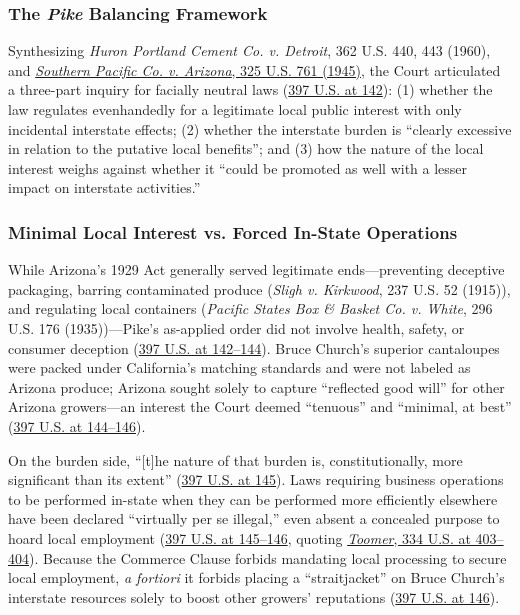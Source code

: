 \documentclass[12pt]{article}
\begin{document}
\subsubsection{The \textit{Pike} Balancing Framework}

Synthesizing \textit{Huron Portland Cement Co. v. Detroit}, 362 U.S. 440, 443 (1960), and \href{https://supreme.justia.com/cases/federal/us/325/761/}{\textit{Southern Pacific Co. v. Arizona}, 325 U.S. 761 (1945)}, the Court articulated a three-part inquiry for facially neutral laws (\href{https://supreme.justia.com/cases/federal/us/397/137/}{397 U.S. at 142}): (1) whether the law regulates evenhandedly for a legitimate local public interest with only incidental interstate effects; (2) whether the interstate burden is ``clearly excessive in relation to the putative local benefits''; and (3) how the nature of the local interest weighs against whether it ``could be promoted as well with a lesser impact on interstate activities.''

\subsubsection{Minimal Local Interest vs. Forced In-State Operations}

While Arizona's 1929 Act generally served legitimate ends---preventing deceptive packaging, barring contaminated produce (\textit{Sligh v. Kirkwood}, 237 U.S. 52 (1915)), and regulating local containers (\textit{Pacific States Box \& Basket Co. v. White}, 296 U.S. 176 (1935))---Pike's as-applied order did not involve health, safety, or consumer deception (\href{https://supreme.justia.com/cases/federal/us/397/137/}{397 U.S. at 142--144}). Bruce Church's superior cantaloupes were packed under California's matching standards and were not labeled as Arizona produce; Arizona sought solely to capture ``reflected good will'' for other Arizona growers---an interest the Court deemed ``tenuous'' and ``minimal, at best'' (\href{https://supreme.justia.com/cases/federal/us/397/137/}{397 U.S. at 144--146}).

On the burden side, ``[t]he nature of that burden is, constitutionally, more significant than its extent'' (\href{https://supreme.justia.com/cases/federal/us/397/137/}{397 U.S. at 145}). Laws requiring business operations to be performed in-state when they can be performed more efficiently elsewhere have been declared ``virtually per se illegal,'' even absent a concealed purpose to hoard local employment (\href{https://supreme.justia.com/cases/federal/us/397/137/}{397 U.S. at 145--146}, quoting \href{https://supreme.justia.com/cases/federal/us/334/385/}{\textit{Toomer}, 334 U.S. at 403--404}). Because the Commerce Clause forbids mandating local processing to secure local employment, \textit{a fortiori} it forbids placing a ``straitjacket'' on Bruce Church's interstate resources solely to boost other growers' reputations (\href{https://supreme.justia.com/cases/federal/us/397/137/}{397 U.S. at 146}).
\end{document}

